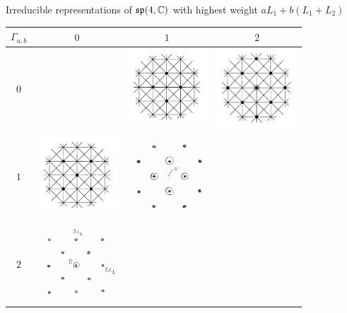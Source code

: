 \documentclass{report}
\begin{document}
\begin{center}
    Irreducible representations of $\operatorname{{\mathfrak{sp}}}(4, \mathbb C)$ with highest weight $aL_1 + b(L_1 + L_2)$\\
    \begin{tabular}{c|c|c|c}
        $\Gamma_{a,b}$ & $0$ & $1$ & $2$\\
        \hline
        $0$ & & \includegraphics[width=3cm]{sp_4_C_weights_standard.png} & \includegraphics[width=3cm]{sp_4_C_weights_adjoint.png} \\
        \hline
        $1$ & \includegraphics[width=3cm]{sp_4_C_weights_Gamma_0_1.png} & \includegraphics[width=3cm]{sp_4_C_weights_Gamma_1_1.jpg} &  \\
        \hline
        $2$ & \includegraphics[width=3cm]{sp_4_C_weights_Gamma_2_0.jpg} &  & \\
    \end{tabular}
\end{center}
\end{document}
